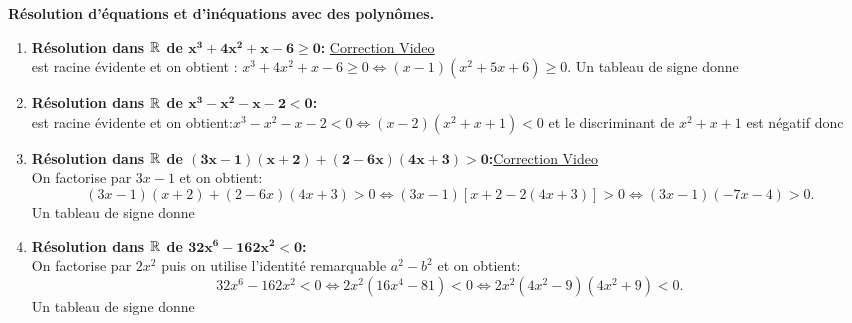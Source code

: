 \documentclass[a4paper, 11pt]{article}
\begin{document}
\begin{correction}  \; \textbf{R\'esolution d'\'equations et d'in\'equations avec des polyn\^{o}mes.}
\begin{enumerate}

\item \textbf{R\'esolution dans $\mathbf{\mathbb{R}}$ de $\mathbf{x^3+4x^2+x-6\geq 0 }$:}  \href{https://youtu.be/tTT0uBYTbWI}{Correction Video}\\
 est racine \'evidente et on obtient : $x^3+4x^2+x-6\geq 0\Leftrightarrow (x-1)(x^2+5x+6)\geq 0$. Un tableau de signe donne 
\item \textbf{R\'esolution dans $\mathbf{\mathbb{R}}$ de $\mathbf{x^3-x^2-x-2<0}$:}\\
 est racine \'evidente et on obtient:$x^3-x^2-x-2<0\Leftrightarrow (x-2)(x^2+x+1)<0$ et le discriminant de $x^2+x+1$ est n\'egatif donc 
\item \textbf{R\'esolution dans $\mathbf{\mathbb{R}}$ de $\mathbf{(3x-1)(x+2)+(2-6x)(4x+3)>0}$:}\href{https://youtu.be/bEAtMfE3GdY}{Correction Video}\\
\noindent On factorise par $3x-1$ et on obtient: 
$$(3x-1)(x+2)+(2-6x)(4x+3)>0\Leftrightarrow (3x-1)\left\lbrack x+2-2(4x+3)\right\rbrack >0\Leftrightarrow (3x-1)(-7x-4)>0.$$ 
Un tableau de signe donne 
\item \textbf{R\'esolution dans $\mathbf{\mathbb{R}}$ de $\mathbf{32x^6-162x^2<0}$:}\\
\noindent On factorise par $2x^2$ puis on utilise l'identit\'e remarquable $a^2-b^2$ et on obtient: 
$$32x^6-162x^2<0\Leftrightarrow 2x^2(16x^4-81)<0\Leftrightarrow 2x^2( 4x^2-9 )(4x^2+9)<0.$$
Un tableau de signe donne 

\end{enumerate}
\end{correction}
\end{document}
